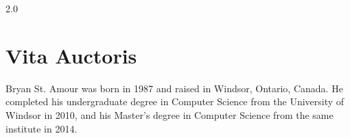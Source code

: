 \documentclass[oneside, 12pt]{book}
\newcommand{\uwindoublespacelen}{2.0}
\newcommand{\uwindefaultspacelen}{\uwindoublespacelen}
\newenvironment{uwindefaultspaceenv}%
{\begin{spacing}{\uwindefaultspacelen}}%
  {\end{spacing}}
\begin{document}
\begin{uwindefaultspaceenv}

\tableofcontents

\listoffigures
\clearpage

\listoftables
\clearpage












\chapter*{Vita Auctoris}

Bryan St. Amour was born in 1987 and raised in Windsor, Ontario, Canada. He completed his undergraduate degree in
Computer Science from the University of Windsor in 2010, and his Master's degree in Computer Science from the same
institute in 2014.


\end{uwindefaultspaceenv}
\end{document}
